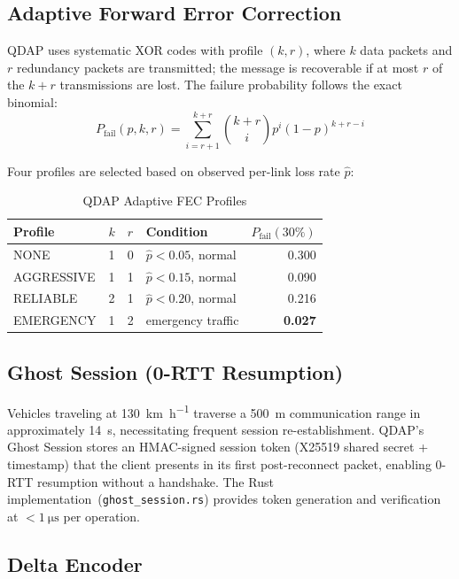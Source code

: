 \documentclass[journal]{IEEEtran}
\begin{document}
\subsection{Adaptive Forward Error Correction}

QDAP uses systematic XOR codes with profile $(k, r)$, where $k$ data
packets and $r$ redundancy packets are transmitted; the message is
recoverable if at most $r$ of the $k{+}r$ transmissions are lost.
The failure probability follows the exact binomial:
\begin{equation}
  P_{\text{fail}}(p, k, r) = \sum_{i=r+1}^{k+r} \binom{k{+}r}{i}
  p^i (1{-}p)^{k+r-i}
  \label{eq:fec}
\end{equation}

Four profiles are selected based on observed per-link loss rate $\hat{p}$:

\begin{table}[h]
\centering
\caption{QDAP Adaptive FEC Profiles}
\label{tab:fec}
\begin{tabular}{llllr}
\toprule
Profile    & $k$ & $r$ & Condition              & $P_\text{fail}(30\%)$ \\
\midrule
NONE       & 1   & 0   & $\hat{p} < 0.05$, normal & 0.300  \\
AGGRESSIVE & 1   & 1   & $\hat{p} < 0.15$, normal & 0.090  \\
RELIABLE   & 2   & 1   & $\hat{p} < 0.20$, normal & 0.216  \\
EMERGENCY  & 1   & 2   & emergency traffic       & \textbf{0.027}  \\
\bottomrule
\end{tabular}
\end{table}

\subsection{Ghost Session (0-RTT Resumption)}

Vehicles traveling at \SI{130}{\kilo\metre\per\hour} traverse a
\SI{500}{\metre} communication range in approximately \SI{14}{\second},
necessitating frequent session re-establishment.
QDAP's Ghost Session stores an HMAC-signed session token (X25519 shared
secret + timestamp) that the client presents in its first post-reconnect
packet, enabling \mbox{0-RTT} resumption without a handshake.
The Rust implementation~(\texttt{ghost\_session.rs}) provides token
generation and verification at $<\SI{1}{\micro\second}$ per operation.

\subsection{Delta Encoder}
\end{document}
